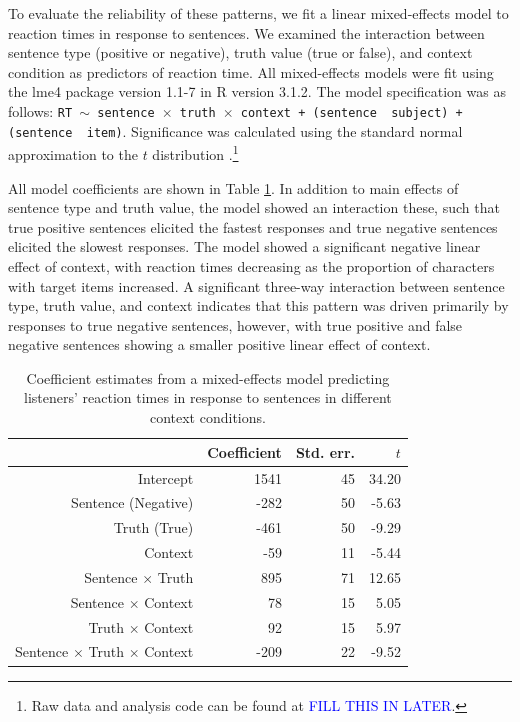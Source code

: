 \documentclass[man, noapacite]{apa2}
\newcommand{\blue}[1]{\textcolor{blue}{#1}}
\begin{document}
To evaluate the reliability of these patterns, we fit a linear mixed-effects model to reaction times in response to sentences.  We examined the interaction between sentence type (positive or negative), truth value (true or false), and context condition as predictors of reaction time. All mixed-effects models were fit using the lme4 package version 1.1-7 in R version 3.1.2.  The model specification was as follows: \texttt{RT $\sim$ sentence~$\times$~truth~$\times$~context + (sentence~\textbar~subject) +  (sentence~\textbar~item)}.  Significance was calculated using the standard normal approximation to the $t$ distribution \cite{barr2013}.\footnote{Raw data and analysis code can be found at \blue{FILL THIS IN LATER}.}

All model coefficients are shown in Table \ref{tab:model}. In addition to main effects of sentence type and truth value, the model showed an interaction these, such that true positive sentences elicited the fastest responses and true negative sentences elicited the slowest responses. The model showed a significant negative linear effect of context, with reaction times decreasing as the proportion of characters with target items increased. A significant three-way interaction between sentence type, truth value, and context indicates that this pattern was driven primarily by responses to true negative sentences, however, with true positive and false negative sentences showing a smaller positive linear effect of context.  

\begin{table}[t]
\caption{\label{tab:model} Coefficient estimates from a mixed-effects model predicting listeners' reaction times in response to sentences in different context conditions.}
\begin{center}
\begin{tabular}{rrrr}
  \hline
 & Coefficient & Std. err. & $t$ \\ 
  \hline
Intercept & 1541 & 45 & 34.20 \\ 
  Sentence (Negative) & -282 & 50 & -5.63  \\ 
  Truth (True) & -461 & 50 & -9.29 \\
  Context & -59 & 11 & -5.44 \\ 
  Sentence $\times$ Truth & 895 & 71 & 12.65 \\
  Sentence $\times$ Context & 78 & 15 & 5.05 \\
  Truth $\times$ Context & 92 & 15 & 5.97 \\
  Sentence $\times$ Truth $\times$ Context & -209 & 22 & -9.52 \\
   \hline
\end{tabular}
\vspace{-1.5cm}
\end{center}
\end{table}
\end{document}
